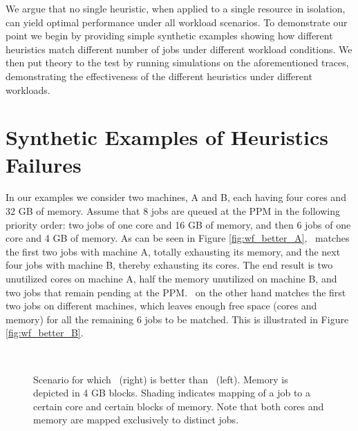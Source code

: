 We argue that no single heuristic, when applied to a single resource in
isolation, can yield optimal performance under all workload
scenarios.
To demonstrate our point we begin by providing simple synthetic examples
showing how different heuristics match different number of jobs under
different workload conditions.
We then put theory to the test by running simulations on the
aforementioned traces, demonstrating the effectiveness of the different heuristics 
under different workloads.


\section{Synthetic Examples of Heuristics Failures}

In our examples we consider two machines, A and B, each having four
cores and 32 GB of memory.
Assume that 8 jobs are queued at the PPM in the following priority order: two jobs
of one core and 16 GB of memory, and then 6 jobs of one core and 4 GB of
memory.
As can be seen in Figure \ref{fig:wf_better_A}, \bef\ matches the first
two jobs with machine A, totally exhausting its memory, and the next
four jobs with machine B, thereby exhausting its cores.
The end result is two unutilized cores on machine A, half the memory
unutilized on machine B, and two jobs that remain pending at the PPM.
\wof\ on the other hand matches the first two jobs on different
machines, which leaves enough free space (cores and memory) for all the
remaining 6 jobs to be matched.
This is illustrated in Figure \ref{fig:wf_better_B}.

\begin{figure}\centering
{}
~~~~
\caption{Scenario for which \wof\ (right) is better than \bef\ (left).
  Memory is depicted in 4 GB blocks.
  Shading indicates mapping of a job to a certain core and certain
  blocks of memory.
  Note that both cores and memory are mapped exclusively to distinct
  jobs.}
\label{fig:wf_better}
\end{figure}

